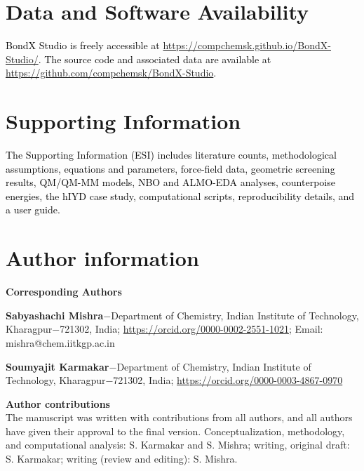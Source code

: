 \documentclass[journal=jcisd8,manuscript=article,layout=two-column]{achemso}
\newcommand{\tcb}[1]{{\textcolor{black}{#1}}}
\begin{document}

\section*{Data and Software Availability}

\tcb{BondX Studio is freely accessible at \url{https://compchemsk.github.io/BondX-Studio/}. The source code and associated data are available at \url{https://github.com/compchemsk/BondX-Studio}.}

\section*{Supporting Information}

\tcb{The Supporting Information (ESI) includes literature counts, methodological assumptions, equations and parameters, force-field data, geometric screening results, QM/QM-MM models, NBO and ALMO-EDA analyses, counterpoise energies, the hIYD case study, computational scripts, reproducibility details, and a user guide.}

\section*{Author information}
\noindent\textbf{Corresponding Authors}

\noindent\textbf{Sabyashachi Mishra}$-$Department of Chemistry, Indian Institute of Technology, Kharagpur$-$721302, India; \url{https://orcid.org/0000-0002-2551-1021}; Email: mishra@chem.iitkgp.ac.in


\noindent\textbf{Soumyajit Karmakar}$-$Department of Chemistry, Indian Institute of Technology, Kharagpur$-$721302, India; \url{https://orcid.org/0000-0003-4867-0970}

\noindent\textbf{Author contributions}\\
The manuscript was written with contributions from all authors, and all authors have given their approval to the final version. Conceptualization, methodology, and computational analysis: S. Karmakar and S. Mishra; writing, original draft: S. Karmakar; writing (review and editing): S. Mishra.
\end{document}
